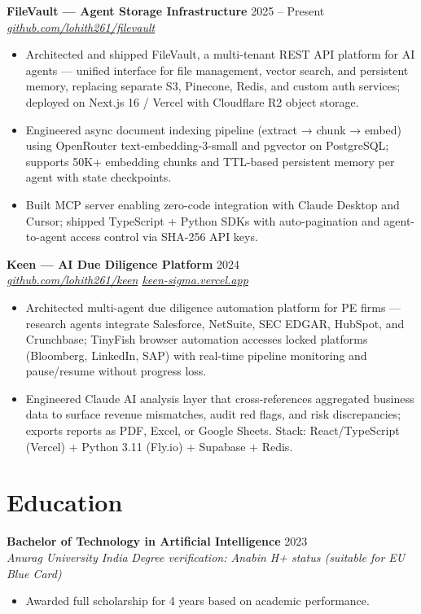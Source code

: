 \documentclass[10pt,letterpaper]{article}
\newcommand{\entry}[3]{%
  \vspace{3pt}\textbf{#1} \hfill #3 \\
  \textit{\small #2}\vspace{1pt}}
\begin{document}
\entry{FileVault --- Agent Storage Infrastructure}{\href{https://github.com/lohith261/filevault}{github.com/lohith261/filevault}}{2025 -- Present}
\begin{itemize}
  \item Architected and shipped FileVault, a multi-tenant REST API platform for AI agents --- unified interface for file management, vector search, and persistent memory, replacing separate S3, Pinecone, Redis, and custom auth services; deployed on Next.js 16 / Vercel with Cloudflare R2 object storage.
  \item Engineered async document indexing pipeline (extract → chunk → embed) using OpenRouter text-embedding-3-small and pgvector on PostgreSQL; supports 50K+ embedding chunks and TTL-based persistent memory per agent with state checkpoints.
  \item Built MCP server enabling zero-code integration with Claude Desktop and Cursor; shipped TypeScript + Python SDKs with auto-pagination and agent-to-agent access control via SHA-256 API keys.
\end{itemize}

\entry{Keen --- AI Due Diligence Platform}{\href{https://github.com/lohith261/keen}{github.com/lohith261/keen} \quad\textbullet\quad \href{https://keen-sigma.vercel.app/}{keen-sigma.vercel.app}}{2024}
\begin{itemize}
  \item Architected multi-agent due diligence automation platform for PE firms --- research agents integrate Salesforce, NetSuite, SEC EDGAR, HubSpot, and Crunchbase; TinyFish browser automation accesses locked platforms (Bloomberg, LinkedIn, SAP) with real-time pipeline monitoring and pause/resume without progress loss.
  \item Engineered Claude AI analysis layer that cross-references aggregated business data to surface revenue mismatches, audit red flags, and risk discrepancies; exports reports as PDF, Excel, or Google Sheets. Stack: React/TypeScript (Vercel) + Python 3.11 (Fly.io) + Supabase + Redis.
\end{itemize}

\section{Education}

\entry{Bachelor of Technology in Artificial Intelligence}{Anurag University \textbullet{} India}{2023}
\newline\textit{\small Degree verification: Anabin H+ status (suitable for EU Blue Card)}
\begin{itemize}
  \item Awarded full scholarship for 4 years based on academic performance.
\end{itemize}
\end{document}

